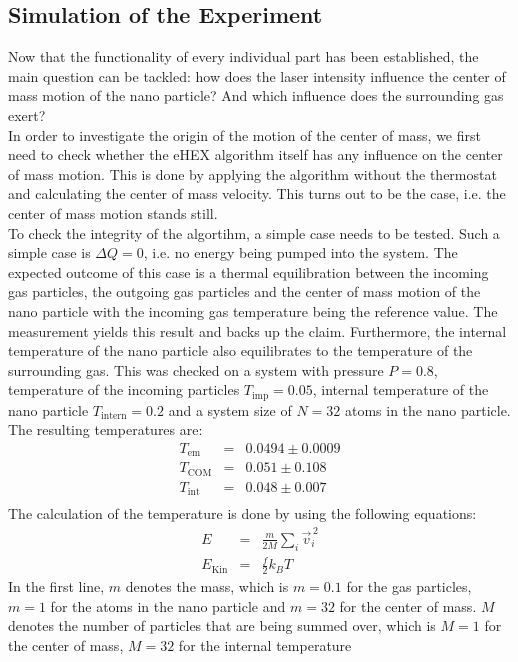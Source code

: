 \documentclass[12pt]{article}
\begin{document}
\subsection{Simulation of the Experiment}
Now that the functionality of every individual part has been established, the main question can be tackled: how does the laser intensity influence the
center of mass motion of the nano particle? And which influence does the surrounding gas exert?\\
In order to investigate the origin of the motion of the center of mass, we first need to check whether the eHEX algorithm itself has any influence on
the center of mass motion. This is done by applying the algorithm without the thermostat and calculating the center of mass velocity. This turns out
to be the case, i.e. the center of mass motion stands still.\\
To check the integrity of the algortihm, a simple case needs to be tested. Such a simple case is $\Delta Q = 0$, i.e. no energy being pumped into the
system. The expected outcome of this case is a thermal equilibration between the incoming gas particles, the outgoing gas particles and the center of
mass motion of the nano particle with the incoming gas temperature being the reference value. 
The measurement yields this result and backs up the claim. Furthermore, the internal temperature of the nano particle also equilibrates to the 
temperature of the surrounding gas. This was checked on a system with pressure $P=0.8$, temperature of the incoming particles $T_\text{imp} = 0.05$, 
internal temperature of the nano particle $T_\text{intern} = 0.2$ and a system size of $N=32$ atoms in the nano
particle. The resulting temperatures are:
\begin{eqnarray*}
    T_\text{em} &=& 0.0494 \pm 0.0009\\
    T_\text{COM} &=& 0.051 \pm 0.108\\
    T_\text{int} &=& 0.048 \pm 0.007\\
\end{eqnarray*}
The calculation of the temperature is done by using the following equations:
\begin{eqnarray}
    \label{eq:ekin}E &=& \frac{m}{2 M} \sum_i \vec{v}_i^{\, 2} \\
    \label{eq:temp}E_\text{Kin} &=& \frac{f}{2} k_B T
\end{eqnarray}
In the first line, $m$ denotes the mass, which is $m=0.1$ for the gas particles, $m=1$ for the atoms in the nano particle and $m=32$ for the center
of mass. $M$ denotes the number of particles that are being summed over, which is $M=1$ for the center of mass, $M=32$ for the internal temperature
\end{document}
